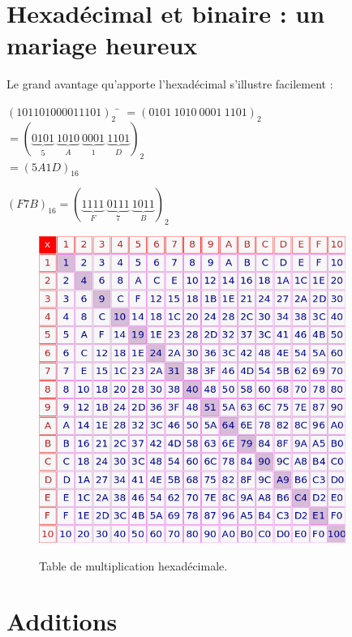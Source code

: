 \section{Hexadécimal et binaire : un mariage heureux}
Le grand avantage qu'apporte l'hexadécimal s'illustre facilement :

\begin{methode}
    \begin{tabbing}
        $(101101000011101)_2$	\=	$=(0101\ 1010\ 0001\ 1101)_2$\\
        \>	$=\left(\underbrace{0101}_5\ \underbrace{1010}_A\ \underbrace{0001}_1\ \underbrace{1101}_D\right)_2$\\
        \>	$=(5A1D)_{16}$
    \end{tabbing}
\end{methode}

\begin{methode}
    $(F7B)_{16}=\left(\underbrace{1111}_F\ \underbrace{0111}_7\ \underbrace{1011}_B\right)_2$
\end{methode}
\begin{figure}
    \begin{center}
        \includegraphics[width=10cm]{ch-bases/img/hexmult.png}\\
        \caption*{Table de multiplication hexadécimale.}
    \end{center}
\end{figure}


\section{Additions}

